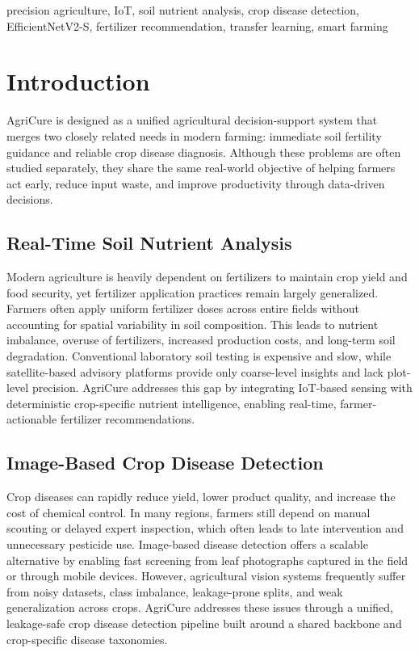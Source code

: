 \documentclass[conference]{IEEEtran}
\begin{document}
\begin{IEEEkeywords}
precision agriculture, IoT, soil nutrient analysis, crop disease detection, EfficientNetV2-S, fertilizer recommendation, transfer learning, smart farming
\end{IEEEkeywords}

\section{Introduction}
AgriCure is designed as a unified agricultural decision-support system that merges two closely related needs in modern farming: immediate soil fertility guidance and reliable crop disease diagnosis. Although these problems are often studied separately, they share the same real-world objective of helping farmers act early, reduce input waste, and improve productivity through data-driven decisions.

\subsection{Real-Time Soil Nutrient Analysis}
Modern agriculture is heavily dependent on fertilizers to maintain crop yield and food security, yet fertilizer application practices remain largely generalized. Farmers often apply uniform fertilizer doses across entire fields without accounting for spatial variability in soil composition. This leads to nutrient imbalance, overuse of fertilizers, increased production costs, and long-term soil degradation. Conventional laboratory soil testing is expensive and slow, while satellite-based advisory platforms provide only coarse-level insights and lack plot-level precision. AgriCure addresses this gap by integrating IoT-based sensing with deterministic crop-specific nutrient intelligence, enabling real-time, farmer-actionable fertilizer recommendations.

\subsection{Image-Based Crop Disease Detection}
Crop diseases can rapidly reduce yield, lower product quality, and increase the cost of chemical control. In many regions, farmers still depend on manual scouting or delayed expert inspection, which often leads to late intervention and unnecessary pesticide use. Image-based disease detection offers a scalable alternative by enabling fast screening from leaf photographs captured in the field or through mobile devices. However, agricultural vision systems frequently suffer from noisy datasets, class imbalance, leakage-prone splits, and weak generalization across crops. AgriCure addresses these issues through a unified, leakage-safe crop disease detection pipeline built around a shared backbone and crop-specific disease taxonomies.
\end{document}
